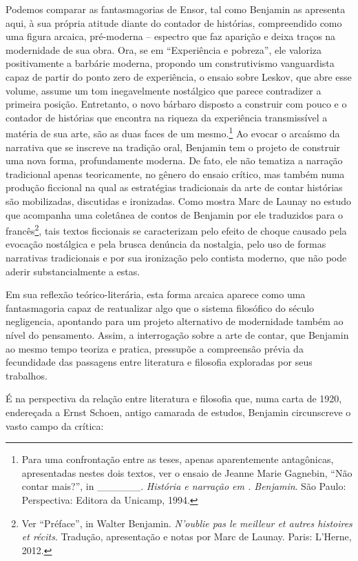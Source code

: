 Podemos comparar as fantasmagorias de Ensor, tal como Benjamin as
apresenta aqui, à sua própria atitude diante do contador de histórias,
compreendido como uma figura arcaica, pré-moderna -- espectro que faz
aparição e deixa traços na modernidade de sua obra. Ora, se em
``Experiência e pobreza'', ele valoriza positivamente a barbárie
moderna, propondo um construtivismo vanguardista capaz de partir do
ponto zero de experiência, o ensaio sobre Leskov, que abre esse volume,
assume um tom inegavelmente nostálgico que parece contradizer a primeira
posição. Entretanto, o novo bárbaro disposto a construir com pouco e o
contador de histórias que encontra na riqueza da experiência
transmissível a matéria de sua arte, são as duas faces de um
mesmo.\footnote{Para uma confrontação entre as teses, apenas
  aparentemente antagônicas, apresentadas nestes dois textos, ver o
  ensaio de Jeanne Marie Gagnebin, ``Não contar mais?'', in
  \_\_\_\_\_\_. \emph{História e narração em . Benjamin}. São Paulo:
  Perspectiva: Editora da Unicamp, 1994.} Ao evocar o arcaísmo da
narrativa que se inscreve na tradição oral, Benjamin tem o projeto de
construir uma nova forma, profundamente moderna. De fato, ele não
tematiza a narração tradicional apenas teoricamente, no gênero do ensaio
crítico, mas também numa produção ficcional na qual as estratégias
tradicionais da arte de contar histórias são mobilizadas, discutidas e
ironizadas. Como mostra Marc de Launay no estudo que acompanha uma
coletânea de contos de Benjamin por ele traduzidos para o
francês\footnote{Ver ``Préface'', in Walter Benjamin. \emph{N'oublie pas
  le meilleur et autres histoires et récits}. Tradução, apresentação e
  notas por Marc de Launay. Paris: L'Herne, 2012.}, tais textos
ficcionais se caracterizam pelo efeito de choque causado pela evocação
nostálgica e pela brusca denúncia da nostalgia, pelo uso de formas
narrativas tradicionais e por sua ironização pelo contista moderno, que
não pode aderir substancialmente a estas.

Em sua reflexão teórico-literária, esta forma arcaica aparece como uma
fantasmagoria capaz de reatualizar algo que o sistema filosófico do
século~ negligencia, apontando para um projeto alternativo de
modernidade também ao nível do pensamento. Assim, a interrogação sobre a
arte de contar, que Benjamin ao mesmo tempo teoriza e pratica, pressupõe
a compreensão prévia da fecundidade das passagens entre literatura e
filosofia exploradas por seus trabalhos.

É na perspectiva da relação entre literatura e filosofia que, numa carta
de 1920, endereçada a Ernst Schoen, antigo camarada de estudos, Benjamin
circunscreve o vasto campo da crítica:

